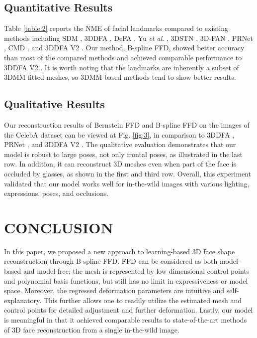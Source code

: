 \documentclass[letterpaper, 10 pt, conference]{ieeeconf}
\begin{document}
\subsection{Quantitative Results}
Table \ref{table:2} reports the NME of facial landmarks compared to existing methods including SDM \cite{xiong2015global}, 3DDFA \cite{zhu2016face}, DeFA \cite{liu2017dense}, Yu \emph{et al}. \cite{yu2017learning}, 3DSTN \cite{bhagavatula2017faster}, 3D-FAN \cite{bulat2017far}, PRNet \cite{feng2018joint}, CMD \cite{zhou2019dense}, and 3DDFA V2 \cite{guo2020towards}. Our method, B-spline FFD, showed better accuracy than most of the compared methods and achieved comparable performance to 3DDFA V2 \cite{guo2020towards}. It is worth noting that the landmarks are inherently a subset of 3DMM fitted meshes, so 3DMM-based methods tend to show better results. 


\subsection{Qualitative Results}
Our reconstruction results of Bernstein FFD and B-spline FFD on the images of the CelebA dataset can be viewed at Fig. \ref{fig:3}, in comparison to 3DDFA \cite{zhu2016face}, PRNet \cite{feng2018joint}, and 3DDFA V2 \cite{guo2020towards}.
The qualitative evaluation demonstrates that our model is robust to large poses, not only frontal poses, as illustrated in the last row. In addition, it can reconstruct 3D meshes even when part of the face is occluded by glasses, as shown in the first and third row. Overall, this experiment validated that our model works well for in-the-wild images with various lighting, expressions, poses, and occlusions.

\section{CONCLUSION}
In this paper, we proposed a new approach to learning-based 3D face shape reconstruction through B-spline FFD. FFD can be considered as both model-based and model-free; the mesh is represented by low dimensional control points and polynomial basis functions, but still has no limit in expressiveness or model space. Moreover, the regressed deformation parameters are intuitive and self-explanatory. This further allows one to readily utilize the estimated mesh and control points for detailed adjustment and further deformation. Lastly, our model is meaningful in that it achieved comparable results to state-of-the-art methods of 3D face reconstruction from a single in-the-wild image.


















\end{document}
